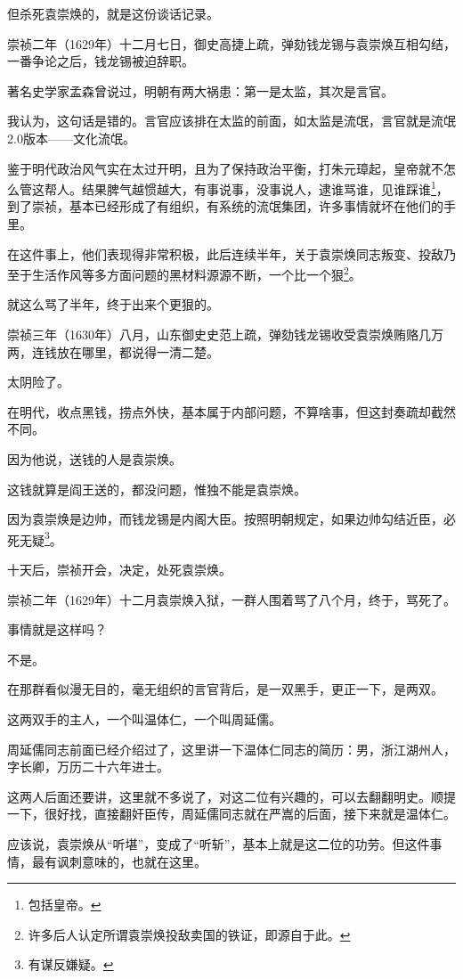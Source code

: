 \begin{multicols}{\theparacolNo}
		但杀死袁崇焕的，就是这份谈话记录。

		崇祯二年（1629年）十二月七日，御史高捷上疏，弹劾钱龙锡与袁崇焕互相勾结，一番争论之后，钱龙锡被迫辞职。

		著名史学家孟森曾说过，明朝有两大祸患：第一是太监，其次是言官。

		我认为，这句话是错的。言官应该排在太监的前面，如太监是流氓，言官就是流氓2.0版本——文化流氓。

		鉴于明代政治风气实在太过开明，且为了保持政治平衡，打朱元璋起，皇帝就不怎么管这帮人。结果脾气越惯越大，有事说事，没事说人，逮谁骂谁，见谁踩谁\footnote{包括皇帝。}，到了崇祯，基本已经形成了有组织，有系统的流氓集团，许多事情就坏在他们的手里。

		在这件事上，他们表现得非常积极，此后连续半年，关于袁崇焕同志叛变、投敌乃至于生活作风等多方面问题的黑材料源源不断，一个比一个狠\footnote{许多后人认定所谓袁崇焕投敌卖国的铁证，即源自于此。}。

		就这么骂了半年，终于出来个更狠的。

		崇祯三年（1630年）八月，山东御史史范上疏，弹劾钱龙锡收受袁崇焕贿赂几万两，连钱放在哪里，都说得一清二楚。

		太阴险了。

		在明代，收点黑钱，捞点外快，基本属于内部问题，不算啥事，但这封奏疏却截然不同。

		因为他说，送钱的人是袁崇焕。

		这钱就算是阎王送的，都没问题，惟独不能是袁崇焕。

		因为袁崇焕是边帅，而钱龙锡是内阁大臣。按照明朝规定，如果边帅勾结近臣，必死无疑\footnote{有谋反嫌疑。}。

		十天后，崇祯开会，决定，处死袁崇焕。

		崇祯二年（1629年）十二月袁崇焕入狱，一群人围着骂了八个月，终于，骂死了。

		事情就是这样吗？

		不是。

		在那群看似漫无目的，毫无组织的言官背后，是一双黑手，更正一下，是两双。

		这两双手的主人，一个叫温体仁，一个叫周延儒。

		周延儒同志前面已经介绍过了，这里讲一下温体仁同志的简历：男，浙江湖州人，字长卿，万历二十六年进士。

		这两人后面还要讲，这里就不多说了，对这二位有兴趣的，可以去翻翻明史。顺提一下，很好找，直接翻奸臣传，周延儒同志就在严嵩的后面，接下来就是温体仁。

		应该说，袁崇焕从“听堪”，变成了“听斩”，基本上就是这二位的功劳。但这件事情，最有讽刺意味的，也就在这里。


\end{multicols}
